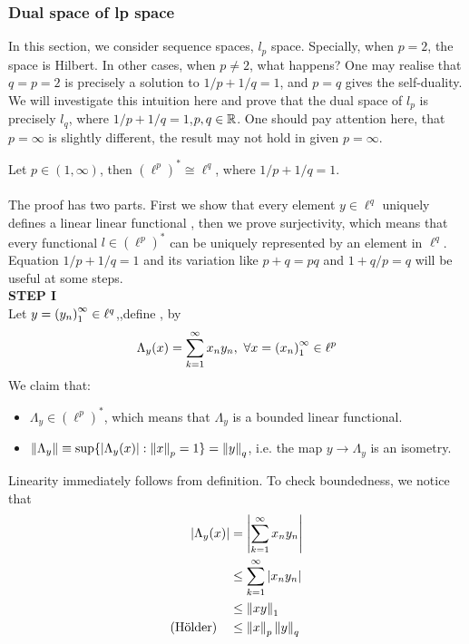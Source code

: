 \subsubsection{Dual space of lp space}\label{lp dual}
In this section, we consider sequence spaces, $l_p$ space. Specially, when $p=2$, the space is Hilbert. In other cases,  when $p\not=2$, what happens? One may realise that $q=p=2$ is precisely a solution to $1/p+1/q=1$, and $p=q$ gives the self-duality. We will investigate this intuition here and prove that the dual space of $l_p$ is precisely $l_q$, where $1/p+1/q=1$,$p,q\in\mathbb{R}$. One should pay attention here, that $p=\infty$ is slightly different, the result may not hold in given $p=\infty$.

\begin{theorem}\rm\nextline
	Let $p\in (1,\infty)$, then $(\ell^p)^*\cong\ell^q $, where $1/p+1/q=1$.\\
	\pf\\
	The proof has two parts. First we show that every element  $y\in\ell^q$ uniquely defines a linear linear functional , then we prove surjectivity, which means that every functional $l\in(\ell^p)^*$ can be uniquely represented by an element in $\ell^q$. Equation $1/p+1/q=1$ and its variation like $p+q=pq$ and  $1+q/p=q$ will be useful at some steps.\\
	{\bf{STEP I}}\\
	Let $y=\left({y_n}\right)_1^\infty\in\ell^q$,,define , by 
	$$\Lambda_y(x)=\sum_{k=1}^{\infty}x_ny_n,\,\,\forall x=\left({x_n}\right)_1^\infty\in\ell^p$$
	We claim that:\begin{itemize}
		\item $\Lambda_y\in(\ell^p)^*$, which means that $\Lambda_y$ is a bounded linear functional.
		\item $\left\|{\Lambda_y}\right\|\equiv\sup\{|\Lambda_y(x)|:\left\|{x}\right\|_p=1\}=\left\|{y}\right\|_q$, i.e. the map $y\rightarrow\Lambda_y$ is an isometry.
	\end{itemize}
	Linearity immediately follows from definition. To check boundedness, we notice that
	\begin{equation}
		\begin{split}
		\left|\Lambda_y(x)\right|&=\left|\sum_{k=1}^{\infty}x_ny_n\right|\\
		&\leq\sum_{k=1}^{\infty}|x_ny_n|\\
		&\leq\norm{xy}_1\\
		\text{(Hölder)}\quad&\leq\norm{x}_p\norm{y}_q
		\end{split}

\end{equation}
\end{theorem}
